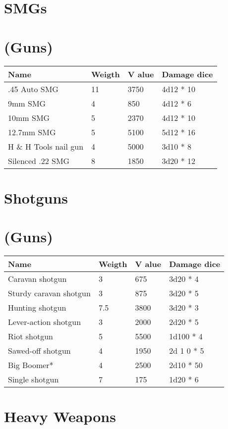 \documentclass{report}
\begin{document}
\begin{table}[H]
\begin{table}[H]
\chapter{SMGs }
\chapter{(Guns)}
\begin{table}[H]
  \centering
\textbf{}\textbf{}  \begin{tabular}{p{30mm}p{30mm}p{30mm}p{30mm}}
\bfseries Name & \bfseries Weigth & \bfseries V alue & \bfseries Damage dice \\
\hline
.45 Auto SMG  & 11 & 3750 & 4d12 * 10 \\
9mm SMG  & 4 & 850 & 4d12 *  6 \\
10mm SMG  & 5 & 2370 & 4d12 *  10 \\
12.7mm SMG & 5 & 5100 & 5d12 *  16 \\
H \& H Tools nail gun  & 4 & 5000 & 3d10 * 8 \\
Silenced .22 SMG  & 8 & 1850 & 3d20 * 12 \\
  \end{tabular}
\chapter{Shotguns }
\chapter{(Guns)}
\begin{table}[H]
  \centering
\textbf{}\textbf{}  \begin{tabular}{p{30mm}p{30mm}p{30mm}p{30mm}}
\bfseries Name & \bfseries Weigth & \bfseries V alue & \bfseries Damage dice \\
\hline
Caravan shotgun  & 3 & 675 & 3d20 *  4 \\
Sturdy caravan shotgun  & 3 & 875 & 3d20 *  5 \\
Hunting shotgun  & 7.5  & 3800 & 3d20 *  3 \\
Lever-action shotgun  & 3 & 2000 & 2d20 *  5 \\
Riot shotgun  & 5 & 5500 & 1d100 *  4 \\
Sawed-off shotgun & 4 & 1950 & 2d 1 0 *  5 \\
Big Boomer*  & 4 & 2500 & 2d10 *  50 \\
Single shotgun  & 7 & 175 & 1d20 *  6 \\
  \end{tabular}
\chapter{Heavy Weapons }

\end{table}
\end{table}
\end{table}
\end{table}
\end{document}
